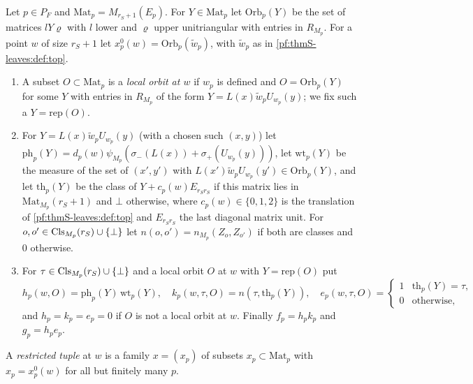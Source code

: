 \begin{definition}\label{pf:thmS-leaves:def:localorbits}
Let $p\in P_F$ and $\mathrm{Mat}_p=M_{r_S+1}(E_p)$. For $Y\in\mathrm{Mat}_p$ let $\mathrm{Orb}_p(Y)$ be the set of matrices
$lY\varrho$ with $l$ lower and $\varrho$ upper unitriangular with entries in $R_{M_p}$. For a point $w$ of size $r_S+1$ let
$x^0_p(w)=\mathrm{Orb}_p(\tilde w_p)$, with $\tilde w_p$ as in \cref{pf:thmS-leaves:def:top}.
\begin{enumerate}
\item A subset $O\subset\mathrm{Mat}_p$ is a \emph{local orbit at $w$} if $w_p$ is defined and $O=\mathrm{Orb}_p(Y)$ for some $Y$
with entries in $R_{M_p}$ of the form $Y=L(x)\tilde w_pU_{w_p}(y)$; we fix such a $Y=\mathrm{rep}(O)$.
\item For $Y=L(x)\tilde w_pU_{w_p}(y)$ (with a chosen such $(x,y)$) let
$\mathrm{ph}_p(Y)=d_p(w)\psi_{M_p}(\sigma_-(L(x))+\sigma_+(U_{w_p}(y)))$, let $\mathrm{wt}_p(Y)$ be the measure of the set of
$(x',y')$ with $L(x')\tilde w_pU_{w_p}(y')\in\mathrm{Orb}_p(Y)$, and let $\mathrm{th}_p(Y)$ be the class of $Y+c_p(w)E_{r_Sr_S}$ if
this matrix lies in $\mathrm{Mat}_{M_p}(r_S+1)$ and $\bot$ otherwise, where $c_p(w)\in\{0,1,2\}$ is the translation of
\cref{pf:thmS-leaves:def:top} and $E_{r_Sr_S}$ the last diagonal matrix unit. For $o,o'\in\mathrm{Cls}_{M_p}(r_S)\cup\{\bot\}$
let $n(o,o')=n_{M_p}(Z_o,Z_{o'})$ if both are classes and $0$ otherwise.
\item For $\tau\in\mathrm{Cls}_{M_p}(r_S)\cup\{\bot\}$ and a local orbit $O$ at $w$ with $Y=\mathrm{rep}(O)$ put
\[
h_p(w,O)=\mathrm{ph}_p(Y)\,\mathrm{wt}_p(Y),\quad k_p(w,\tau,O)=n(\tau,\mathrm{th}_p(Y)),\quad
e_p(w,\tau,O)=\begin{cases}1&\mathrm{th}_p(Y)=\tau,\\0&\text{otherwise,}\end{cases}
\]
and $h_p=k_p=e_p=0$ if $O$ is not a local orbit at $w$. Finally $f_p=h_pk_p$ and $g_p=h_pe_p$.
\end{enumerate}
A \emph{restricted tuple} at $w$ is a family $x=(x_p)$ of subsets $x_p\subset\mathrm{Mat}_p$ with $x_p=x^0_p(w)$ for all but
finitely many $p$.
\end{definition}

